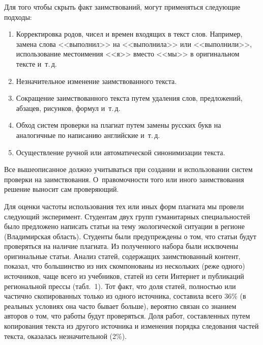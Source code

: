 \begin{multicols}{2}
  Для того чтобы скрыть факт заимствований, могут применяться следующие 
подходы:
  \begin{enumerate}[1.]
  \item Корректировка родов, чисел и времен входящих в текст слов. 
Например, замена слова <<выполнил>> на <<выполнила>> или 
<<выполнили>>, использование местоимения <<я>> вместо <<мы>> в 
оригинальном тексте и~т.\,д.
  \item Незначительное изменение заимствованного текста.
\item  Сокращение заимствованного текста путем удаления слов, предложений, 
абзацев, рисунков, формул и~т.\,д.
  \item Обход сис\-тем проверки на плагиат путем замены русских букв на 
аналогичные по написанию английские и~т.\,д.
  \item Осуществление ручной или автоматической синонимизации текста.
  \end{enumerate}
  
  Все вышеописанное должно учитываться при создании и использовании 
  сис\-тем проверки на заимствования. О~правомочности того или иного 
заимствования решение выносит сам проверяющий.
  
  Для оценки частоты использования тех или иных форм плагиата мы провели 
следующий эксперимент. Студентам двух групп гуманитарных специальностей 
было предложено написать статьи на тему экологической ситуации в регионе 
(Владимирская область). Студенты были предупреждены о том, что статьи 
будут проверяться на наличие плагиата. Из полученного набора были 
исключены оригинальные статьи. Анализ статей, содержащих заимствованный 
контент, показал, что большинство из них скомпонованы из нескольких (реже 
одного) источников, чаще всего из учебников, статей из сети Интернет и 
публикаций региональной прессы (табл.~1). Тот факт, что доля статей, 
полностью или частично скопированных только из одного источника, 
составила всего 36\% (в реальных условиях она часто бывает больше), вероятно 
связан со знанием авторов о том, что работы будут проверяться. Доля работ, 
составленных путем копирования текста из другого источника и изменения 
порядка следования частей текста, оказалась незначительной (2\%).




\end{multicols}
